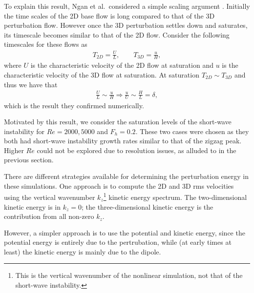 To explain this result, Ngan et al.\ considered a simple scaling argument \cite{ngan2004,ngan2005}. Initially the time scales of the 2D base flow is long compared to that of the 3D perturbation flow. However once the 3D perturbation settles down and saturates, its timescale becomes similar to that of the 2D flow.  Consider the following timescales for these flows \cite{ngan2005} as
\begin{align}
T_{2D} = \frac{U}{L},\qquad T_{3D} =\frac{u}{H},
\end{align}
where $U$ is the characteristic velocity of the 2D flow at saturation and $u$ is the characteristic velocity of the 3D flow at saturation. At saturation $T_{2D}\sim T_{3D}$ and thus we have that 
\begin{align}
\frac{U}{L}\sim\frac{u}{H} \Rightarrow \frac{u}{U} \sim \frac{H}{L} = \delta,
\end{align}
which is the result they confirmed numerically. 

Motivated by this result, we consider the saturation levels of the short-wave instability for $Re=2000,5000$ and $F_{h}=0.2$. These two cases were chosen as they both had short-wave instability growth rates similar to that of the zigzag peak. Higher $Re$ could not be explored due to resolution issues, as alluded to in the previous section. 

There are different strategies available for determining the perturbation energy in these simulations. One approach is to compute the 2D and 3D rms velocities using the vertical wavenumber $k_{z}$\footnote{This is the vertical wavenumber of the nonlinear simulation, not that of the short-wave instability.} kinetic energy spectrum. The two-dimensional kinetic energy is in $k_{z}=0$; the three-dimensional kinetic energy is the contribution from all non-zero $k_{z}$. 

However, a simpler approach is to use the potential and kinetic energy, since the potential energy is entirely due to the pertrubation, while (at early times at least) the kinetic energy is mainly due to the dipole.

